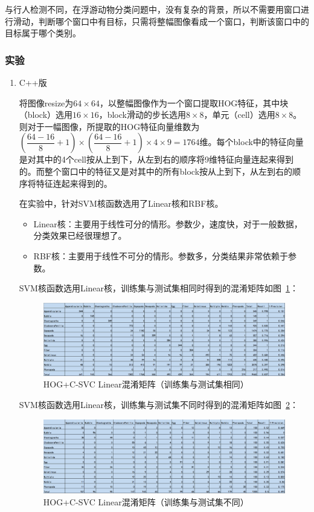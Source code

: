\documentclass[12pt]{article}
\begin{document}
与行人检测不同，在浮游动物分类问题中，没有复杂的背景，所以不需要用窗口进行滑动，判断哪个窗口中有目标，只需将整幅图像看成一个窗口，判断该窗口中的目标属于哪个类别。

\subsubsection{实验}

\begin{enumerate}
\item C++版

将图像resize为$64 \times 64$，以整幅图像作为一个窗口提取HOG特征，其中块（block）选用$16 \times 16$，block滑动的步长选用$8 \times 8$，单元（cell）选用$8 \times 8$。则对于一幅图像，所提取的HOG特征向量维数为$(\dfrac{64-16}{8}+1)\times (\dfrac{64-16}{8}+1) \times 4\times 9=1764$维。每个block中的特征向量是对其中的4个cell按从上到下，从左到右的顺序将9维特征向量连起来得到的。而整个窗口中的特征又是对其中的所有block按从上到下，从左到右的顺序将特征连起来得到的。

在实验中，针对SVM核函数选用了Linear核和RBF核。

\begin{itemize} 
\item Linear核：主要用于线性可分的情形。参数少，速度快，对于一般数据，分类效果已经很理想了。
\item RBF核：主要用于线性不可分的情形。参数多，分类结果非常依赖于参数。
\end{itemize}

SVM核函数选用Linear核，训练集与测试集相同时得到的混淆矩阵如图~\ref{fig: Train-CM-HOG-SVM-Linear}：
\begin{figure}[!ht]
\centering
\includegraphics[width=1.0\linewidth]{Train-CM-HOG-SVM-Linear}
\caption{HOG+C-SVC Linear混淆矩阵（训练集与测试集相同）}
\label{fig: Train-CM-HOG-SVM-Linear}
\end{figure}

SVM核函数选用Linear核，训练集与测试集不同时得到的混淆矩阵如图~\ref{fig: Test-CM-HOG-SVM-linear}：
\begin{figure}[!ht]
\centering
\includegraphics[width=1.0\linewidth]{Test-CM-HOG-SVM-linear}
\caption{HOG+C-SVC Linear混淆矩阵（训练集与测试集不同）}
\label{fig: Test-CM-HOG-SVM-linear}
\end{figure}


\end{enumerate}
\end{document}

